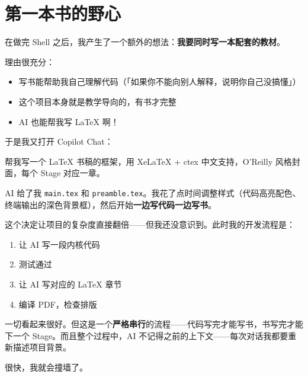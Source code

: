 \section{第一本书的野心}

在做完 Shell 之后，我产生了一个额外的想法：\textbf{我要同时写一本配套的教材}。

理由很充分：
\begin{itemize}
  \item 写书能帮助我自己理解代码（「如果你不能向别人解释，说明你自己没搞懂」）
  \item 这个项目本身就是教学导向的，有书才完整
  \item AI 也能帮我写 LaTeX 啊！
\end{itemize}

于是我又打开 Copilot Chat：

\begin{humanmsg}
帮我写一个 LaTeX 书稿的框架，用 XeLaTeX + ctex 中文支持，O'Reilly 风格封面，每个 Stage 对应一章。
\end{humanmsg}

AI 给了我 \texttt{main.tex} 和 \texttt{preamble.tex}。我花了点时间调整样式（代码高亮配色、终端输出的深色背景框），然后开始\textbf{一边写代码一边写书}。

这个决定让项目的复杂度直接翻倍——但我还没意识到。此时我的开发流程是：

\begin{enumerate}
  \item 让 AI 写一段内核代码
  \item 测试通过
  \item 让 AI 写对应的 LaTeX 章节
  \item 编译 PDF，检查排版
\end{enumerate}

一切看起来很好。但这是一个\textbf{严格串行}的流程——代码写完才能写书，书写完才能下一个 Stage。而且整个过程中，AI 不记得之前的上下文——每次对话我都要重新描述项目背景。

很快，我就会撞墙了。
